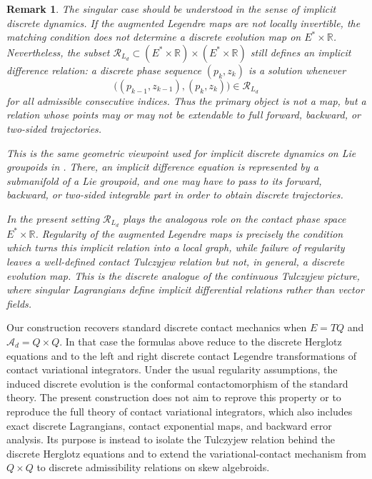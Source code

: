 \documentclass[11pt]{article}
\newtheorem{remark}[theorem]{Remark}
\newcommand{\R}{\mathbb{R}}
\newcommand{\mc}[1]{\mathcal{#1}}
\begin{document}
\begin{remark}
The singular case should be understood in the sense of implicit discrete
dynamics. If the augmented Legendre maps are not locally invertible, the
matching condition does not determine a discrete evolution map on
\(E^*\times\R\). Nevertheless, the subset $\mc R_{L_d}\subset (E^*\times\R)\times(E^*\times\R)$ still defines an implicit difference relation: a discrete phase sequence
\((p_k,z_k)\) is a solution whenever
\[
\bigl((p_{k-1},z_{k-1}),(p_k,z_k)\bigr)\in \mc R_{L_d}
\]
for all admissible consecutive indices. Thus the primary object is not a
map, but a relation whose points may or may not be extendable to full
forward, backward, or two-sided trajectories.

This is the same geometric viewpoint used for implicit discrete dynamics on
Lie groupoids in \cite{IglesiasMarreroMartindeDiegoPadron2013}. There, an
implicit difference equation is represented by a submanifold of a Lie groupoid,
and one may have to pass to its forward, backward, or two-sided integrable
part in order to obtain discrete trajectories. 

In the present setting
\(\mc R_{L_d}\) plays the analogous role on the contact phase space
\(E^*\times\R\). Regularity of the augmented Legendre maps is precisely the
condition which turns this implicit relation into a local graph, while failure
of regularity leaves a well-defined contact Tulczyjew relation but not, in
general, a discrete evolution map. This is the discrete analogue of the
continuous Tulczyjew picture, where singular Lagrangians define implicit
differential relations rather than vector fields.
\end{remark}



Our construction recovers standard discrete contact mechanics
\cite{SimoesMartinDeDiegoLainzDeLeon2021} when \(E=TQ\) and
\(\mc A_d=Q\times Q\). In that case the formulas above reduce to the discrete
Herglotz equations and to the left and right discrete contact Legendre
transformations of contact variational integrators. Under the usual regularity
assumptions, the induced discrete evolution is the conformal contactomorphism of
the standard theory. The present construction does not aim to reprove this
property or to reproduce the full theory of contact variational integrators,
which also includes exact discrete Lagrangians, contact exponential maps, and
backward error analysis. Its purpose is instead to isolate the Tulczyjew
relation behind the discrete Herglotz equations and to extend the
variational-contact mechanism from \(Q\times Q\) to discrete admissibility
relations on skew algebroids.
\end{document}
